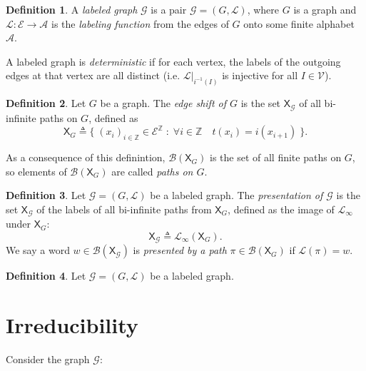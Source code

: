 \documentclass{article}
\newcommand{\Ac}{\mathcal{A}}  %
\newcommand{\Lc}{\mathcal{L}}  %
\newcommand{\Gc}{\mathcal{G}}  %
\newcommand{\Vc}{\mathcal{V}}
\newcommand{\Ec}{\mathcal{E}}
\newcommand{\Bc}{\mathcal{B}}
\newcommand{\shift}[1]{\mathsf{X}_{#1}}
\newcommand{\term}[1]{\textit{#1}}
\theoremstyle{definition}
\newtheorem{definition}{Definition}
\begin{document}
\begin{definition}
    A \term{labeled graph} \(\Gc\) is a pair \(\Gc = (G, \Lc)\), where \(G\) is a graph and \(\Lc : \Ec \to \Ac\) is the 
    \term{labeling function} from the edges of \(G\) onto some finite alphabet \(\Ac\).

    A labeled graph is \term{deterministic} if for each vertex, the labels of the outgoing edges at that vertex are all distinct 
    (i.e. \(\Lc|_{i^{-1}(I)}\) is injective for all \(I \in \Vc\)).
\end{definition}

\begin{definition}
    Let \(G\) be a graph. The \term{edge shift of \(G\)} is the set \(\shift{\Gc}\) of all bi-infinite 
    paths on \(G\), defined as 
    \[\shift{G} \triangleq \Big\{ \; (x_i)_{i \in \mathbb{Z}} \in \Ec^\mathbb{Z} \; : \; \forall i \in \mathbb{Z} \quad t(x_i) = i(x_{i+1}) \; \Big\}. \]
\end{definition}

\noindent As a consequence of this definintion, \(\Bc(\shift{G})\) is the 
set of all finite paths on \(G\), so elements of \(\Bc(\shift{G})\) are called
\term{paths on \(G\)}.


\begin{definition}
    Let \(\Gc = (G, \Lc)\) be a labeled graph. The \term{presentation of \(\Gc\)} is the set \(\shift{\Gc}\)
    of the labels of all bi-infinite paths from \(\shift{G}\), defined as the image of 
    \(\Lc_\infty\) under \(\shift{G}\): \[\shift{\Gc} \triangleq \Lc_\infty(\shift{G}).\]
    We say a word \(w \in \Bc(\shift{\Gc})\) is \term{presented by a path} \(\pi \in \Bc(\shift{G})\) if \(\Lc(\pi) = w\).
\end{definition}

\begin{definition}
    Let \(\Gc = (G, \Lc)\) be a labeled graph. 
\end{definition}

    


\section{Irreducibility}

\noindent Consider the graph \(\Gc\):

\begin{figure}[h]
    \centering
\end{figure}
\end{document}
